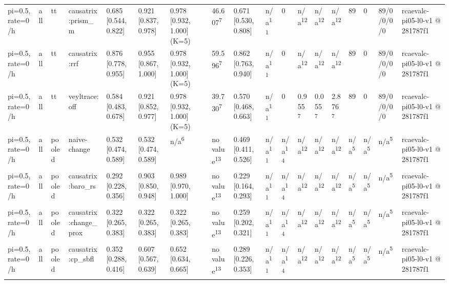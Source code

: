 \begin{table}[t]
\begin{tabular}{llllllllllllllllll}
pi=0.5, rate=0/h & all & tt & causatrix:prism\_m & 0.685 [0.544, 0.822] & 0.921 [0.837, 0.978] & 0.978 [0.932, 1.000] (K=5) & 46.607\textsuperscript{7} & 0.671 [0.530, 0.808] & n/a\textsuperscript{11} & 0 & n/a\textsuperscript{12} & n/a\textsuperscript{12} & n/a\textsuperscript{12} & 89 & 0 & 89/0/0/0/0 & rcaevalc-pi05-l0-v1 @ 281787f1 \\
pi=0.5, rate=0/h & all & tt & causatrix:rrf & 0.876 [0.778, 0.955] & 0.955 [0.867, 1.000] & 0.978 [0.932, 1.000] (K=5) & 59.596\textsuperscript{7} & 0.862 [0.763, 0.940] & n/a\textsuperscript{11} & 0 & n/a\textsuperscript{12} & n/a\textsuperscript{12} & n/a\textsuperscript{12} & 89 & 0 & 89/0/0/0/0 & rcaevalc-pi05-l0-v1 @ 281787f1 \\
pi=0.5, rate=0/h & all & tt & veyltrace:off & 0.584 [0.483, 0.678] & 0.921 [0.852, 0.977] & 0.978 [0.932, 1.000] (K=5) & 39.730\textsuperscript{7} & 0.570 [0.468, 0.663] & n/a\textsuperscript{11} & 0 & 0.955\textsuperscript{7} & 0.055\textsuperscript{7} & 2.876\textsuperscript{7} & 89 & 0 & 89/0/0/0/0 & rcaevalc-pi05-l0-v1 @ 281787f1 \\
pi=0.5, rate=0/h & all & pooled & naive-change & 0.532 [0.474, 0.589] & 0.532 [0.474, 0.589] & n/a\textsuperscript{6} & no value\textsuperscript{13} & 0.469 [0.411, 0.526] & n/a\textsuperscript{11} & n/a\textsuperscript{14} & n/a\textsuperscript{12} & n/a\textsuperscript{12} & n/a\textsuperscript{12} & n/a\textsuperscript{5} & n/a\textsuperscript{5} & n/a\textsuperscript{5} & rcaevalc-pi05-l0-v1 @ 281787f1 \\
pi=0.5, rate=0/h & all & pooled & causatrix:baro\_rs & 0.292 [0.228, 0.356] & 0.903 [0.850, 0.948] & 0.989 [0.970, 1.000] & no value\textsuperscript{13} & 0.229 [0.164, 0.293] & n/a\textsuperscript{11} & n/a\textsuperscript{14} & n/a\textsuperscript{12} & n/a\textsuperscript{12} & n/a\textsuperscript{12} & n/a\textsuperscript{5} & n/a\textsuperscript{5} & n/a\textsuperscript{5} & rcaevalc-pi05-l0-v1 @ 281787f1 \\
pi=0.5, rate=0/h & all & pooled & causatrix:change\_prox & 0.322 [0.265, 0.383] & 0.322 [0.265, 0.383] & 0.322 [0.265, 0.383] & no value\textsuperscript{13} & 0.259 [0.202, 0.321] & n/a\textsuperscript{11} & n/a\textsuperscript{14} & n/a\textsuperscript{12} & n/a\textsuperscript{12} & n/a\textsuperscript{12} & n/a\textsuperscript{5} & n/a\textsuperscript{5} & n/a\textsuperscript{5} & rcaevalc-pi05-l0-v1 @ 281787f1 \\
pi=0.5, rate=0/h & all & pooled & causatrix:cp\_sbfl & 0.352 [0.288, 0.416] & 0.607 [0.567, 0.639] & 0.652 [0.634, 0.665] & no value\textsuperscript{13} & 0.289 [0.226, 0.353] & n/a\textsuperscript{11} & n/a\textsuperscript{14} & n/a\textsuperscript{12} & n/a\textsuperscript{12} & n/a\textsuperscript{12} & n/a\textsuperscript{5} & n/a\textsuperscript{5} & n/a\textsuperscript{5} & rcaevalc-pi05-l0-v1 @ 281787f1 \\

\end{tabular}
\end{table}
